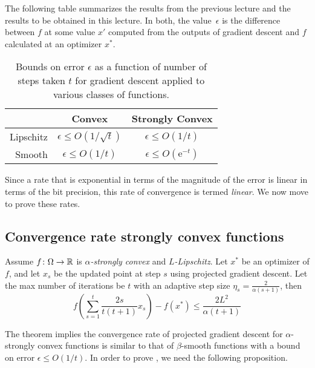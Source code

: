 The following table summarizes the results from the previous lecture and the
results to be obtained in this lecture.  In both, the value~$\epsilon$ is the
difference between $f$ at some value $x'$ computed from the outputs of gradient
descent and $f$ calculated at an optimizer $x^*$.

\begin{table}[h]
    \centering
    \begin{tabular}{|r|c|c|}
        \hline
         & Convex & Strongly Convex\\
        \hline
         Lipschitz & $\epsilon \leq O(1/\sqrt{t})$
         & $\epsilon \leq O(1/t)$ \\
         \hline
         Smooth & $\epsilon \leq O(1/t)$
         & $\epsilon \leq O(\mathrm{e}^{-t})$ \\
         \hline
    \end{tabular}
    \caption{Bounds on error $\epsilon$
    as a function of number of steps taken $t$
    for gradient descent applied to various classes of functions.}
    \label{tab:proofs}
\end{table}

Since a rate that is exponential in terms of the magnitude of the error is
linear in terms of the bit precision, this rate of convergence is termed
\emph{linear}.  We now move to prove these rates.

\subsection{Convergence rate strongly convex functions}

\begin{theorem} 
Assume $f\colon\Omega\to\mathbb{R}$ is \emph{$\alpha$-strongly convex} and
\emph{$L$-Lipschitz}. Let $x^{*}$ be an optimizer of $f$, and let $x_{s}$ be the
updated point at step $s$ using projected gradient descent. Let the max number
of iterations be $t$ with an adaptive step size $\eta_{s} =
\frac{2}{\alpha(s+1)}$, then 
\[
f\left(\sum_{s=1}^{t}\frac{2s}{t(t+1)}x_{s}\right) - f(x^{*})\leq\frac{2 L^{2}}{\alpha(t+1)}
\]
\end{theorem}

The theorem implies the convergence rate of projected gradient descent for
$\alpha$-strongly convex functions is similar to that of $\beta$-smooth
functions with a bound on error $\epsilon \leq O(1/t)$.  In order to prove
, we need the following proposition.


